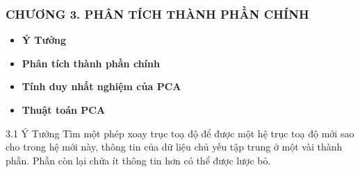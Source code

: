 \documentclass[notheorems,envcountsect,hyperref=unicode]{beamer}
\newcommand{\R}{\mathbb R}
\newcommand{\N}{\mathbb N}
\def\A{\mathcal{A}}
\def\R{\mathbb{R}}
\def\N{\mathbb{N}}
\def\lp{\ell_p}
\def\lq{\ell_q}
\def\Lp{\mathbf{L_p}}
\def\Lo{\mathbf{L_{\infty}}}
\def\m{\mu}
\def\dissum{\displaystyle\sum}
\def\kgdd{(X,\A,\mu)}
\begin{document}


\begin{frame}
	\frametitle{\MakeUppercase{\textsc\bf\large CHƯƠNG 3. Phân tích thành phần chính}}
	\renewcommand{\baselinestretch}{1.5}
	\begin{itemize}
		\item [3.1] \textbf{Ý Tưởng}
		\item [3.2] \textbf{Phân tích thành phần chính }
		\item [3.3] \textbf{Tính duy nhất nghiệm của PCA}
		\item [3.4] \textbf{Thuật toán PCA}
	\end{itemize}
\end{frame}
\begin{frame}{3.1 Ý Tưởng }
Tìm một phép xoay trục toạ độ để được một hệ trục toạ độ mới sao cho trong hệ mới này, thông tin của dữ liệu chủ yếu tập trung ở một vài thành phần. Phần còn lại chứa ít thông tin hơn có thể được lược bỏ.
%

\end{frame}
\end{document}
